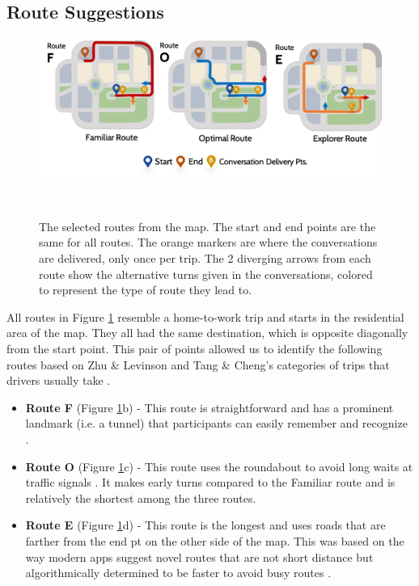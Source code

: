 \subsection{Route Suggestions}
\label{sec:routes}

\begin{figure}
\centering
  \includegraphics[scale=0.6]{figures/s2-all-routes.png}
  \caption{The selected routes from the map. The start and end points are the same for all routes. The orange markers are where the conversations are delivered, only once per trip. The 2 diverging arrows from each route show the alternative turns given in the conversations, colored to represent the type of route they lead to.}~\label{fig:s2-all-routes}
\end{figure}

All routes in Figure \ref{fig:s2-all-routes} resemble a home-to-work trip and starts in the residential area of the map. They all had the same destination, which is opposite diagonally from the start point. This pair of points allowed us to identify the following routes based on Zhu \& Levinson and Tang \& Cheng's categories of trips that drivers usually take \cite{Tang2016AnalyzingData, Zhu2015DoPrinciple}.

\begin{itemize}
    \item \textbf{Route F} (Figure \ref{fig:s2-all-routes}b) - This route is straightforward and has a prominent landmark (i.e. a tunnel) that participants can easily remember and recognize \cite{antrobus_large_burnett_hare_2019}. 
    \item \textbf{Route O} (Figure \ref{fig:s2-all-routes}c) - This route uses the roundabout to avoid long waits at traffic signals \cite{Ringhand2017InvestigatingTime, Samson:2019:EFI:3290605.3300601}. It makes early turns compared to the Familiar route and is relatively the shortest among the three routes. 
    \item \textbf{Route E} (Figure \ref{fig:s2-all-routes}d) - This route is the longest and uses roads that are farther from the end pt on the other side of the map. This was based on the way modern apps suggest novel routes that are not short distance but algorithmically determined to be faster to avoid busy routes \cite{Samson:2019:EFI:3290605.3300601}.
\end{itemize}

